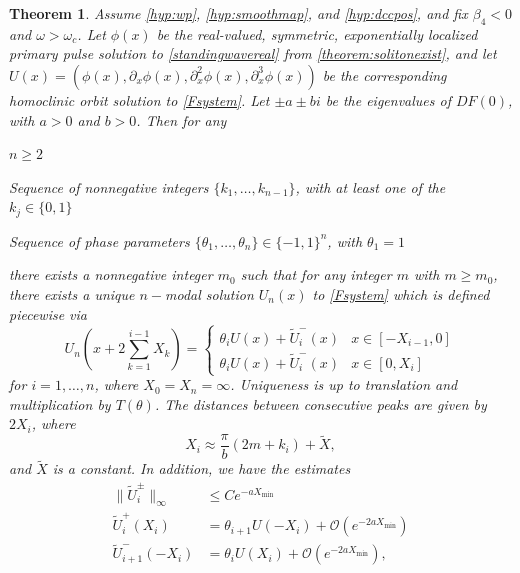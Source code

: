 \documentclass[12pt]{elsarticle}
\newtheorem{theorem}{Theorem}
\begin{document}
\begin{theorem}\label{theorem:multiexist}
Assume \cref{hyp:wp}, \cref{hyp:smoothmap}, and \cref{hyp:dccpos}, and fix $\beta_4 < 0$ and $\omega > \omega_c$. Let $\phi(x)$ be the real-valued, symmetric, exponentially localized primary pulse solution to \cref{standingwavereal} from \cref{theorem:solitonexist}, and let $U(x) = (\phi(x), \partial_x \phi(x), \partial_x^2 \phi(x), \partial_x^3 \phi(x))$ be the corresponding homoclinic orbit solution to \cref{Fsystem}. Let $\pm a \pm bi$ be the eigenvalues of $DF(0)$, with $a > 0$ and $b > 0$. Then for any 
\begin{compactenum}[(i)]
\item $n \geq 2$
\item Sequence of nonnegative integers $\{ k_1, \dots, k_{n-1} \}$, with at least one of the $k_j \in \{0, 1 \}$
\item Sequence of phase parameters $\{ \theta_1, \dots, \theta_n \} \in \{-1, 1 \}^n$, with $\theta_1 = 1$
\end{compactenum}
there exists a nonnegative integer $m_0$ such that for any integer $m$ with $m \geq m_0$, there exists a unique $n-$modal solution $U_n(x)$ to \cref{Fsystem} which is defined piecewise via
\begin{equation}\label{Unpiecewise}
U_n\left( x + 2 \sum_{k=1}^{i-1} X_k \right) = \begin{cases} 
\theta_i U(x) + \tilde{U}_i^-(x) & x \in [-X_{i-1}, 0] \\
\theta_i U(x) + \tilde{U}_i^-(x) & x \in [0, X_i]
\end{cases}
\end{equation}
for $i = 1, \dots, n$, where $X_0 = X_n = \infty$. Uniqueness is up to translation and multiplication by $T(\theta)$. The distances between consecutive peaks are given by $2 X_i$, where
\begin{equation}\label{pulsedistances}
X_i \approx \frac{\pi}{b}(2 m + k_i) + \tilde{X},
\end{equation}
and $\tilde{X}$ is a constant. In addition, we have the estimates
\begin{equation}\label{Unestimates}
\begin{aligned}
\|\tilde{U}_i^\pm\|_\infty &\leq C e^{-a X_{\mathrm{min}}} \\
\tilde{U}_i^+(X_i) &= \theta_{i+1} U(-X_i) + \mathcal{O}(e^{-2 a X_{\min}}) \\
\tilde{U}_{i+1}^-(-X_i) &= \theta_i U(X_i) + \mathcal{O}(e^{-2 a X_{\min}}),
\end{aligned}

\end{equation}
\end{theorem}
\end{document}
